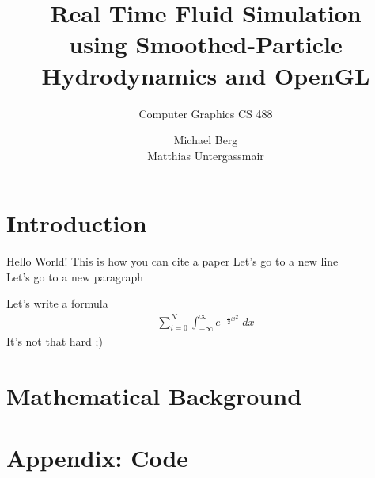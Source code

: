\documentclass[fontsize=11pt]{scrartcl}
\title{Real Time Fluid Simulation \\ \smaller using Smoothed-Particle Hydrodynamics and OpenGL}
\subtitle{Computer Graphics CS 488}
\author{Michael Berg \\ Matthias Untergassmair}
\begin{document}
\maketitle


\clearpage

\section{Introduction}
%
Hello World! This is how you can cite a paper \cite{realtimerendering} Let's go to a new line \\
Let's go to a new paragraph \par\medskip
Let's write a formula
\begin{align*}
	\sum_{i=0}^N \int_{-\infty}^\infty e^{-\frac{1}{2}x^2} \; dx
\end{align*}
%
It's not that hard ;)

\section{Mathematical Background}

\section*{Appendix: Code}



\clearpage
\nocite{*}
\printbibliography
\end{document}

